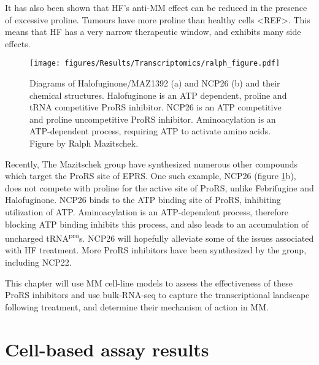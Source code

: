 It has also been shown that HF's anti-MM effect can be reduced in the presence of excessive proline.
Tumours have more proline than healthy cells <REF>.
This means that HF has a very narrow therapeutic window, and exhibits many side effects.

\begin{figure}[ht]
    \centering
    \texttt{[image: figures/Results/Transcriptomics/ralph\_figure.pdf]}
    \caption[Halofuginone and NCP26 structures]{Diagrams of Halofuginone/MAZ1392 (a) and NCP26 (b) and their chemical structures.
    Halofuginone is an ATP dependent, proline and tRNA competitive ProRS inhibitor.
    NCP26 is an ATP competitive and proline uncompetitive ProRS inhibitor.
    Aminoacylation is an ATP-dependent process, requiring ATP to activate amino acids.
    Figure by Ralph Mazitschek.
    }
    \label{fig:ralph_diagrams}
\end{figure}

Recently, The Mazitschek group have synthesized numerous other compounds which target the ProRS site of EPRS.
One such example, NCP26 (figure \ref{fig:ralph_diagrams}b), does not compete with proline for the active site of ProRS, unlike Febrifugine and Halofuginone.
NCP26 binds to the ATP binding site of ProRS, inhibiting utilization of ATP\@.
Aminoacylation is an ATP-dependent process, therefore blocking ATP binding inhibits this process, and also leads to an accumulation of uncharged tRNA\textsuperscript{pro}s.
NCP26 will hopefully alleviate some of the issues associated with HF treatment.
More ProRS inhibitors have been synthesized by the group, including NCP22.

This chapter will use MM cell-line models to assess the effectiveness of these ProRS inhibitors and use bulk-RNA-seq to capture the transcriptional landscape following treatment, and determine their mechanism of action in MM\@.

\clearpage

\section{Cell-based assay results}
